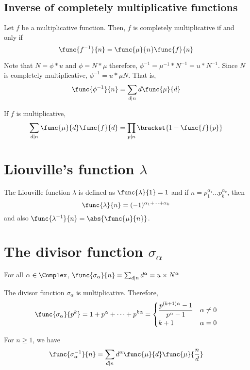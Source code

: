 \subsection{Inverse of completely multiplicative functions}
\begin{theorem}
    Let \(f\) be a multiplicative function. Then, \(f\) is completely multiplicative if and only if 
    \begin{equation*}
        \func{f^{-1}}{n} = \func{\mu}{n} \func{f}{n}
    \end{equation*}
\end{theorem}
\begin{remark}
    Note that \(N = \phi \ast u\) and \(\phi = N \ast \mu\) therefore, \(\phi^{-1}= \mu^{-1} \ast N^{-1} = u \ast N^{-1}\). Since \(N\) is completely multiplicative, \(\phi^{-1} = u \ast \mu N\). That is, 
    \begin{equation*}
        \func{\phi^{-1}}{n} = \sum_{d \mid n} d \func{\mu}{d}
    \end{equation*}
\end{remark}
\begin{theorem}
    If \(f\) is multiplicative,
    \begin{equation*}
        \sum_{d \mid n} \func{\mu}{d} \func{f}{d} = \prod_{p \mid n} \bracket{1 - \func{f}{p}}
    \end{equation*}
\end{theorem}
\section{Liouville's function \(\lambda\)}
\begin{definition}
    The Liouville function \(\lambda\) is defined as \(\func{\lambda}{1} = 1\) and if \(n = p_1^{\alpha_1} \dots p_k^{\alpha_k}\), then 
    \begin{equation*}
        \func{\lambda}{n} = (-1)^{\alpha_1 + \dots + \alpha_k}
    \end{equation*}
    and also \(\func{\lambda^{-1}}{n} = \abs{\func{\mu}{n}}\).
\end{definition}
\section{The divisor function \(\sigma_{\alpha}\)}
\begin{definition}
    For all \(\alpha \in \Complex\), \(\func{\sigma_{\alpha}}{n} = \sum_{d \mid n} d^{\alpha} = u \times N^{\alpha}\)
\end{definition}
\begin{proposition}
    The divisor function \(\sigma_{\alpha}\) is multiplicative. Therefore,
    \begin{equation*}
        \func{\sigma_{\alpha}}{p^k} = 1 + p^{\alpha} + \dots + p^{k \alpha} = \begin{cases}
            \dfrac{p^{(k+1)\alpha} - 1}{p^{\alpha} - 1} & \alpha \neq 0\\
            k + 1 & \alpha = 0
        \end{cases}
    \end{equation*}
\end{proposition}

\begin{theorem}
    For \(n \geq 1\), we have 
    \begin{equation*}
        \func{\sigma_{\alpha}^{-1}}{n} = \sum_{d \mid n} d^{\alpha} \func{\mu}{d} \func{\mu}{\frac{n}{d}}
    \end{equation*}
\end{theorem}

